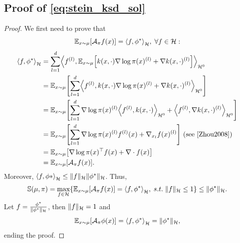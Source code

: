 \documentclass{article}
\newcommand{\E}{\mathbb{E}}
\renewcommand{\S}{\mathbb{S}}
\newcommand{\A}{\mathcal{A}}
\renewcommand{\H}{\mathcal{H}}
\renewcommand{\S}{\mathbb{S}}
\DeclarePairedDelimiter{\norm}{\|}{\|}
\DeclarePairedDelimiter{\bra}{\{}{\}}
\DeclarePairedDelimiter{\sq}{[}{]}
\DeclarePairedDelimiter{\sca}{\langle}{\rangle}
\begin{document}
\subsection{Proof of \ref{eq:stein_ksd_sol}}
\begin{proof}\label{proof:KSD}
  We first need to prove that
  $$
  \E_{x \sim \mu} \sq*{ \A_\pi f(x) } = \sca*{f, \phi^*}_\H, \; \forall f \in \H:
  $$
  \begin{equation*}
    \begin{split}
      \sca*{f, \phi^*}_\H &= \sum_{l=1}^d \sca*{ f^{(l)},
        \E_{x \sim \mu}\sq*{ k(x, \cdot) \nabla \log \pi(x)^{(l)} + \nabla k(x, \cdot)^{(l)}} }_{\H^0} \\
        &= \E_{x \sim \mu}\sq*{ \sum_{l=1}^d \sca*{f^{(l)}, k(x, \cdot)
          \nabla \log \pi(x)^{(l)} + \nabla k(x, \cdot)^{(l)} }_{\H^0} } \\
        &= \E_{x \sim \mu}\sq*{ \sum_{l=1}^d \nabla \log \pi(x)^{(l)}
          \sca*{ f^{(l)}, k(x, \cdot) }_{\H^0} + \sca*{ f^{(l)}, \nabla k(x, \cdot)^{(l)} }_{\H^0} } \\
        &= \E_{x \sim \mu}\sq*{ \sum_{l=1}^d \nabla \log \pi(x)^{(l)} f^{(l)}(x) + \nabla_{x_l} f(x)^{(l)} }
         \text{ (see \cite{Zhou2008}) } \\
        &= \E_{x \sim \mu}\sq*{ \nabla \log \pi(x)^\top f(x) + \nabla \cdot f(x) } \\
        &= \E_{x \sim \mu} \sq*{ \A_\pi f(x) }.
    \end{split}
  \end{equation*}
  Moreover, $\sca*{ f, \phi* }_\H \leq \norm{f}_\H \norm{\phi^*}_\H$.
  Thus,
  $$
  \S(\mu, \pi) =
    \max_{f \in \H} \bra*{ \E_{x \sim \mu}[\A_\pi f (x)] = \sca*{f, \phi^*}_\H, \; s.t. \; \|f\|_{\H} \leq 1 }
    \leq \norm{\phi^*}_\H.
  $$
  Let $f = \frac{\phi^*}{\norm{\phi^*}_\H}$, then $\norm{f}_\H = 1$ and
  $$
  \E_{x \sim \mu}[\A_\pi \phi (x)] = \sca*{f, \phi^*}_\H = \norm{\phi^*}_\H,
  $$
  ending the proof.
\end{proof}
\end{document}
